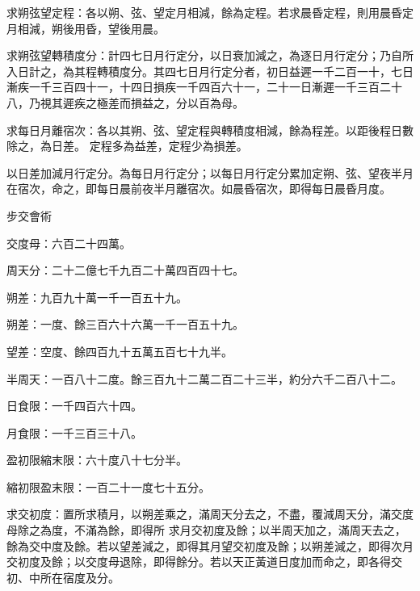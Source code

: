 \begin{pinyinscope}
 求朔弦望定程：各以朔、弦、望定月相減，餘為定程。若求晨昏定程，則用晨昏定月相減，朔後用昏，望後用晨。



 求朔弦望轉積度分：計四七日月行定分，以日衰加減之，為逐日月行定分；乃自所入日計之，為其程轉積度分。其四七日月行定分者，初日益遲一千二百一十，七日漸疾一千三百四十一，十四日損疾一千四百六十一，二十一日漸遲一千三百二十八，乃視其遲疾之極差而損益之，分以百為母。



 求每日月離宿次：各以其朔、弦、望定程與轉積度相減，餘為程差。以距後程日數除之，為日差。
 定程多為益差，定程少為損差。



 以日差加減月行定分。為每日月行定分；以每日月行定分累加定朔、弦、望夜半月在宿次，命之，即每日晨前夜半月離宿次。如晨昏宿次，即得每日晨昏月度。



 步交會術



 交度母：六百二十四萬。



 周天分：二十二億七千九百二十萬四百四十七。



 朔差：九百九十萬一千一百五十九。



 朔差：一度、餘三百六十六萬一千一百五十九。



 望差：空度、餘四百九十五萬五百七十九半。



 半周天：一百八十二度。餘三百九十二萬二百二十三半，約分六千二百八十二。



 日食限：一千四百六十四。



 月食限：一千三百三十八。



 盈初限縮末限：六十度八十七分半。



 縮初限盈末限：一百二十一度七十五分。



 求交初度：置所求積月，以朔差乘之，滿周天分去之，不盡，覆減周天分，滿交度母除之為度，不滿為餘，即得所
 求月交初度及餘；以半周天加之，滿周天去之，餘為交中度及餘。若以望差減之，即得其月望交初度及餘；以朔差減之，即得次月交初度及餘；以交度母退除，即得餘分。若以天正黃道日度加而命之，即各得交初、中所在宿度及分。




\end{pinyinscope}
